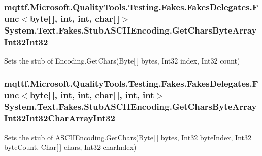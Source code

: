 \hypertarget{class_system_1_1_text_1_1_fakes_1_1_stub_a_s_c_i_i_encoding_afc90e63f2e71a24df2e4c010a32206fb}{
\subsubsection[{Get\-Chars\-Byte\-Array\-Int32\-Int32}]{\setlength{\rightskip}{0pt plus 5cm}mqttf.\-Microsoft.\-Quality\-Tools.\-Testing.\-Fakes.\-Fakes\-Delegates.\-Func$<$byte\mbox{[}$\,$\mbox{]}, int, int, char\mbox{[}$\,$\mbox{]}$>$ System.\-Text.\-Fakes.\-Stub\-A\-S\-C\-I\-I\-Encoding.\-Get\-Chars\-Byte\-Array\-Int32\-Int32}}\label{class_system_1_1_text_1_1_fakes_1_1_stub_a_s_c_i_i_encoding_afc90e63f2e71a24df2e4c010a32206fb}


Sets the stub of Encoding.\-Get\-Chars(\-Byte\mbox{[}$\,$\mbox{]} bytes, Int32 index, Int32 count)

\hypertarget{class_system_1_1_text_1_1_fakes_1_1_stub_a_s_c_i_i_encoding_a5cd12e29508a1f1bdac6e2b35f59ba21}{
\subsubsection[{Get\-Chars\-Byte\-Array\-Int32\-Int32\-Char\-Array\-Int32}]{\setlength{\rightskip}{0pt plus 5cm}mqttf.\-Microsoft.\-Quality\-Tools.\-Testing.\-Fakes.\-Fakes\-Delegates.\-Func$<$byte\mbox{[}$\,$\mbox{]}, int, int, char\mbox{[}$\,$\mbox{]}, int, int$>$ System.\-Text.\-Fakes.\-Stub\-A\-S\-C\-I\-I\-Encoding.\-Get\-Chars\-Byte\-Array\-Int32\-Int32\-Char\-Array\-Int32}}\label{class_system_1_1_text_1_1_fakes_1_1_stub_a_s_c_i_i_encoding_a5cd12e29508a1f1bdac6e2b35f59ba21}


Sets the stub of A\-S\-C\-I\-I\-Encoding.\-Get\-Chars(\-Byte\mbox{[}$\,$\mbox{]} bytes, Int32 byte\-Index, Int32 byte\-Count, Char\mbox{[}$\,$\mbox{]} chars, Int32 char\-Index)

